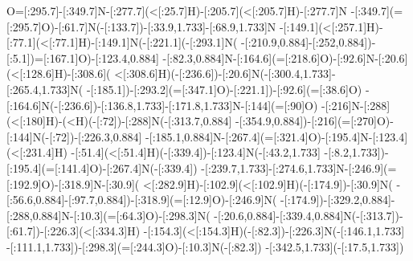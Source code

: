 O=[:295.7]-[:349.7]N-[:277.7](<[:25.7]H)-[:205.7](<[:205.7]H)-[:277.7]N%
-[:349.7](=[:295.7]O)-[:61.7]N(-[:133.7])-[:33.9,1.733]-[:68.9,1.733]N%
-[:149.1](<[:257.1]H)-[:77.1](<[:77.1]H)-[:149.1]N(-[:221.1](-[:293.1]N(%
-[:210.9,0.884]-[:252,0.884]\phantom{N})-[:5.1])=[:167.1]O)-[:123.4,0.884]%
-[:82.3,0.884]N-[:164.6](=[:218.6]O)-[:92.6]N-[:20.6](<[:128.6]H)-[:308.6](%
<[:308.6]H)(-[:236.6]\phantom{N})-[:20.6]N(-[:300.4,1.733]-[:265.4,1.733]N(%
-[:185.1])-[:293.2](=[:347.1]O)-[:221.1]\phantom{N})-[:92.6](=[:38.6]O)%
-[:164.6]N(-[:236.6])-[:136.8,1.733]-[:171.8,1.733]N-[:144](=[:90]O)%
-[:216]N-[:288](<[:180]H)-(<H)(-[:72]\phantom{N})-[:288]N(-[:313.7,0.884]%
-[:354.9,0.884]\phantom{N})-[:216](=[:270]O)-[:144]N(-[:72])-[:226.3,0.884]%
-[:185.1,0.884]N-[:267.4](=[:321.4]O)-[:195.4]N-[:123.4](<[:231.4]H)%
-[:51.4](<[:51.4]H)(-[:339.4]\phantom{N})-[:123.4]N(-[:43.2,1.733]%
-[:8.2,1.733]\phantom{N})-[:195.4](=[:141.4]O)-[:267.4]N(-[:339.4])%
-[:239.7,1.733]-[:274.6,1.733]N-[:246.9](=[:192.9]O)-[:318.9]N-[:30.9](%
<[:282.9]H)-[:102.9](<[:102.9]H)(-[:174.9]\phantom{N})-[:30.9]N(%
-[:56.6,0.884]-[:97.7,0.884]\phantom{N})-[:318.9](=[:12.9]O)-[:246.9]N(%
-[:174.9])-[:329.2,0.884]-[:288,0.884]N-[:10.3](=[:64.3]O)-[:298.3]N(%
-[:20.6,0.884]-[:339.4,0.884]N(-[:313.7])-[:61.7])-[:226.3](<[:334.3]H)%
-[:154.3](<[:154.3]H)(-[:82.3]\phantom{N})-[:226.3]N(-[:146.1,1.733]%
-[:111.1,1.733]\phantom{N})-[:298.3](=[:244.3]O)-[:10.3]N(-[:82.3])%
-[:342.5,1.733](-[:17.5,1.733]\phantom{N})